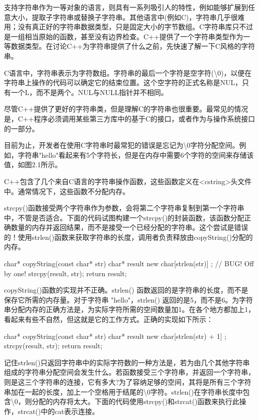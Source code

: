 
支持字符串作为一等对象的语言，则具有一系列吸引人的特性，例如能够扩展到任意大小，提取子字符串或替换子字符串。其他语言中(例如C)，字符串几乎很难用；没有真正好的字符串数据类型，只是固定大小的字节数组。C字符串库只不过是一组相当原始的函数，甚至没有边界检查。C++提供了一个字符串类型作为一等数据类型。在讨论C++为字符串提供了什么之前，先快速了解一下C风格的字符串。


C语言中，字符串表示为字符数组。字符串的最后一个字符是空字符(\textbackslash{}0)，以便在字符串上操作的代码可以确定它的结束位置。这个空字符的正式名称是NUL，只有一个L，而不是两个。NUL与NULL指针并不相同。

尽管C++提供了更好的字符串类，但是理解C的字符串也很重要。最常见的情况是，C++程序必须调用某些第三方库中的基于C的接口，或者作为与操作系统接口的一部分。

目前为止，开发者在使用C字符串时最常犯的错误是忘记为\textbackslash{}0字符分配空间。例如，字符串"hello"看起来有5个字符长，但是在内存中需要6个字符的空间来存储该值，如图2.1所示。


C++包含了几个来自C语言的字符串操作函数，这些函数定义在<cstring>头文件中。通常情况下，这些函数不分配内存。

strcpy()函数接受两个字符串作为参数，会将第二个字符串复制到第一个字符串中，不管是否适合。下面的代码试图构建一个strcpy()的封装函数，该函数分配正确数量的内存并返回结果，而不是接受一个已经分配的字符串。这个尝试是错误的！使用strlen()函数来获取字符串的长度，调用者负责释放由copyString()分配的内存。

\begin{cpp}
char* copyString(const char* str)
{
    char* result { new char[strlen(str)] }; // BUG! Off by one!
    strcpy(result, str);
    return result;
}
\end{cpp}

copyString()函数的实现并不正确。strlen() 函数返回的是字符串的长度，而不是保存它所需的内存量。对于字符串 "hello"，strlen() 返回的是5，而不是6。为字符串分配内存的正确方法是，为实际字符所需的空间数量加1。在各个地方都加上1，看起来有些不自然，但这就是它的工作方式。正确的实现如下所示：

\begin{cpp}
char* copyString(const char* str)
{
    char* result { new char[strlen(str) + 1] };
    strcpy(result, str);
    return result;
}
\end{cpp}

记住strlen()只返回字符串中的实际字符数的一种方法是，若为由几个其他字符串组成的字符串分配空间会发生什么。若函数接受三个字符串，并返回一个字符串，则是这三个字符串的连接，它有多大?为了容纳足够的空间，其将是所有三个字符串加在一起的长度，加上一个空格用于结尾的\textbackslash{}0字符。strlen()在字符串长度中包含\textbackslash{}0，则分配的内存将太大。下面的代码使用strcpy()和strcat()函数来执行此操作，strcat()中的cat表示连接。

